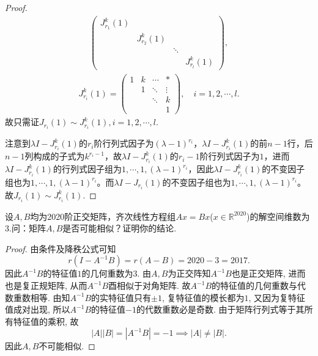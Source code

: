 \documentclass[../../main.tex]{subfiles}
\begin{document}
\begin{proof}
\begin{align*}
\begin{pmatrix}
J_{r_1}^k(1) & & & \\
& J_{r_2}^k(1) & & \\
& & \ddots & \\
& & & J_{r_l}^k(1)
\end{pmatrix},
\end{align*}
\begin{align*}
J_{r_i}^k(1)=\begin{pmatrix}
1 & k & \cdots & * \\
& 1 & \ddots & \vdots \\
& & \ddots & k \\
& & & 1
\end{pmatrix},\quad i=1,2,\cdots,l.
\end{align*}
故只需证$J_{r_i}(1)\sim J_{r_i}^k(1),i=1,2,\cdots,l.$

注意到$\lambda I-J_{r_i}^k(1)$的$r_i$阶行列式因子为$(\lambda-1)^{r_i}$，$\lambda I-J_{r_i}^k(1)$的前$n-1$行，后$n-1$列构成的子式为$k^{r_i-1}$，故$\lambda I-J_{r_i}^k(1)$的$r_i-1$阶行列式因子为$1$，进而$\lambda I-J_{r_i}^k(1)$的行列式因子组为$1,\cdots,1,(\lambda-1)^{r_i}$，因此$\lambda I-J_{r_i}^k(1)$的不变因子组也为$1,\cdots,1,(\lambda-1)^{r_i}$。而$\lambda I-J_{r_i}(1)$的不变因子组也为$1,\cdots,1,(\lambda-1)^{r_i}$。故$J_{r_i}(1)\sim J_{r_i}^k(1)$.

\end{proof}

\begin{example}
设$A,B$均为2020阶正交矩阵，齐次线性方程组$Ax=Bx$($x \in \mathbb{R}^{2020}$)的解空间维数为3.问：矩阵$A,B$是否可能相似？证明你的结论.
\end{example}
\begin{proof}
由条件及降秩公式可知
$$r(I - A^{-1}B) = r(A - B) = 2020 - 3 = 2017.$$
因此$A^{-1}B$的特征值$1$的几何重数为$3$. 由$A,B$为正交阵知$A^{-1}B$也是正交矩阵, 进而也是复正规矩阵, 从而$A^{-1}B$酉相似于对角矩阵. 故$A^{-1}B$的特征值的几何重数与代数重数相等.
由知$A^{-1}B$的实特征值只有$\pm 1$, 复特征值的模长都为$1$, 又因为复特征值成对出现, 所以$A^{-1}B$的特征值$-1$的代数重数必是奇数.
由于矩阵行列式等于其所有特征值的乘积, 故
$$|A||B| = |A^{-1}B| = -1 \implies |A| \neq |B|.$$
因此$A,B$不可能相似.

\end{proof}
\end{document}
